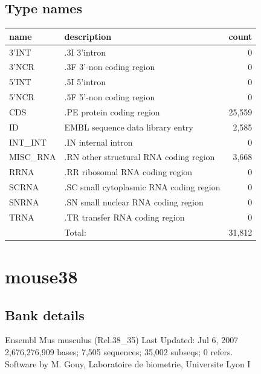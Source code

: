 \documentclass{article}
\begin{document}
\begin{Schunk}
\subsection{Type names}
\noindent\begin{tabular}{llr}
\hline \hline
name & description & count \\
\hline
3'INT  &  .3I 3'intron  &  0 \\
3'NCR  &  .3F  3'-non coding region  &  0 \\
5'INT  &  .5I 5'intron  &  0 \\
5'NCR  &  .5F  5'-non coding region  &  0 \\
CDS  &  .PE protein coding region  &  25,559 \\
ID  &  EMBL sequence data library entry  &  2,585 \\
INT\_INT  &  .IN  internal intron  &  0 \\
MISC\_RNA  &  .RN other structural RNA coding region  &  3,668 \\
RRNA  &  .RR ribosomal RNA coding region  &  0 \\
SCRNA  &  .SC small cytoplasmic RNA coding region  &  0 \\
SNRNA  &  .SN small nuclear RNA coding region  &  0 \\
TRNA  &  .TR transfer RNA coding region  &  0 \\
\hline
 & Total: & 31,812 \\
\hline \hline
\end{tabular}

\section{ mouse38 }
\subsection{Bank details}
Ensembl Mus musculus (Rel.38\_35) Last Updated: Jul  6, 2007\\
2,676,276,909 bases; 7,505 sequences; 35,002 subseqs; 0 refers.\\
Software by M. Gouy, Laboratoire de biometrie, Universite Lyon I


\end{Schunk}
\end{document}
